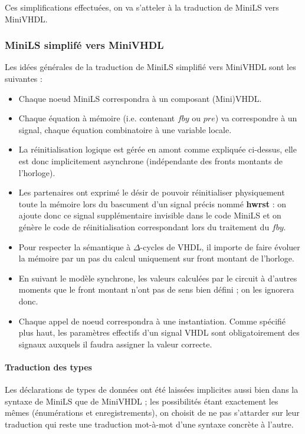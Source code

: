 \documentclass[9pt,a4paper]{article}
\begin{document}
Ces simplifications effectuées, on va s'atteler à la traduction de MiniLS vers
MiniVHDL.

\subsubsection{MiniLS simplifé vers MiniVHDL}

Les idées générales de la traduction de MiniLS simplifié vers MiniVHDL sont les
suivantes :

\begin{itemize}
\item Chaque noeud MiniLS correspondra à un composant (Mini)VHDL.
\item Chaque équation à mémoire (i.e. contenant $fby$ ou $pre$) va correspondre
  à un signal, chaque équation combinatoire à une variable locale.
\item La réinitialisation logique est gérée en amont comme expliquée ci-dessus,
  elle est donc implicitement asynchrone (indépendante des fronts montants de
  l'horloge).
\item Les partenaires ont exprimé le désir de pouvoir réinitialiser physiquement
  toute la mémoire lors du bascument d'un signal précis nommé \textbf{hwrst} :
  on ajoute donc ce signal supplémentaire invisible dans le code MiniLS et on
  génère le code de réinitialisation correspondant lors du traitement du $fby$.
\item Pour respecter la sémantique à $\Delta$-cycles de VHDL, il importe de
  faire évoluer la mémoire par un pas du calcul uniquement sur front montant de
  l'horloge.
\item En suivant le modèle synchrone, les valeurs calculées par le circuit à
  d'autres moments que le front montant n'ont pas de sens bien défini ; on les
  ignorera donc.
\item Chaque appel de noeud correspondra à une instantiation. Comme spécifié
  plus haut, les paramètres effectifs d'un signal VHDL sont obligatoirement des
  signaux auxquels il faudra assigner la valeur correcte.
\end{itemize}

\paragraph{Traduction des types}

Les déclarations de types de données ont été laissées implicites aussi bien dans
la syntaxe de MiniLS que de MiniVHDL ; les possibilités étant exactement les
mêmes (énumérations et enregistrements), on choisit de ne pas s'attarder sur
leur traduction qui reste une traduction mot-à-mot d'une syntaxe concrète à
l'autre.
\end{document}
